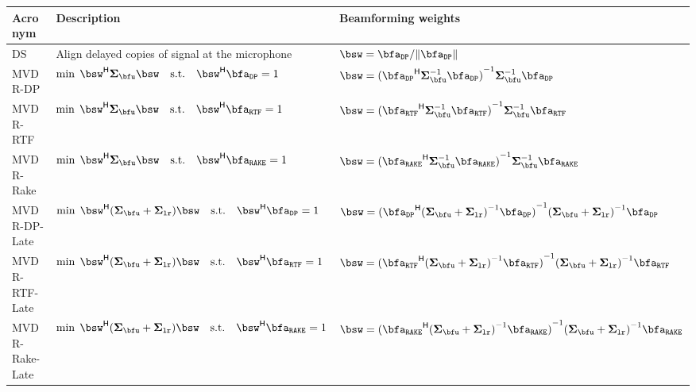 \begin{tabular*}{\linewidth}{lll}
\toprule
Acronym & Description & Beamforming weights \\
\midrule
DS              & Align delayed copies of signal at the microphone
                    &  $\bsw = \bfa_\mathtt{DP} / \kvvbar{\bfa_\mathtt{DP}} $ \\
MVDR-DP         & $\min\; \khermitian{\bsw} \xpsd_{\bfu} \bsw \quad \text{s.t.} \quad \khermitian{\bsw} \bfa_\mathtt{DP} = 1$
                    &  $\bsw = \kinv{(\khermitian{\bfa_\mathtt{DP}} \kinv{\xpsd}_{\bfu}  \bfa_\mathtt{DP})} \kinv{\xpsd}_{\bfu}  \bfa_\mathtt{DP}$\\
MVDR-RTF        & $\min\; \khermitian{\bsw} \xpsd_{\bfu} \bsw \quad \text{s.t.} \quad \khermitian{\bsw} \bfa_\mathtt{RTF} = 1$
                    &  $\bsw = \kinv{(\khermitian{\bfa_\mathtt{RTF}} \kinv{\xpsd}_{\bfu}  \bfa_\mathtt{RTF})} \kinv{\xpsd}_{\bfu}  \bfa_\mathtt{RTF}$\\
MVDR-Rake       & $\min\; \khermitian{\bsw} \xpsd_{\bfu} \bsw \quad \text{s.t.} \quad \khermitian{\bsw} \bfa_\mathtt{RAKE} = 1$
                    &  $\bsw = \kinv{(\khermitian{\bfa_\mathtt{RAKE}} \kinv{\xpsd}_{\bfu}  \bfa_\mathtt{RAKE})} \kinv{\xpsd}_{\bfu}  \bfa_\mathtt{RAKE}$\\
MVDR-DP-Late    & $\min\; \khermitian{\bsw} (\xpsd_{\bfu} + \xpsd_{\mathtt{lr}}) \bsw \quad \text{s.t.} \quad \khermitian{\bsw} \bfa_{\mathtt{DP}} = 1$
                    &  $\bsw = \kinv{(\khermitian{\bfa_\mathtt{DP}} \kinv{(\xpsd_{\bfu} + \xpsd_{\mathtt{lr}})}  \bfa_\mathtt{DP})} \kinv{(\xpsd_{\bfu} + \xpsd_{\mathtt{lr}})}  \bfa_\mathtt{DP}$      \\
MVDR-RTF-Late   & $\min\; \khermitian{\bsw} (\xpsd_{\bfu} + \xpsd_{\mathtt{lr}}) \bsw \quad \text{s.t.} \quad \khermitian{\bsw} \bfa_{\mathtt{RTF}} = 1$
                    &  $\bsw = \kinv{(\khermitian{\bfa_\mathtt{RTF}} \kinv{(\xpsd_{\bfu} + \xpsd_{\mathtt{lr}})}  \bfa_\mathtt{RTF})} \kinv{(\xpsd_{\bfu} + \xpsd_{\mathtt{lr}})}  \bfa_\mathtt{RTF}$   \\
MVDR-Rake-Late  & $\min\; \khermitian{\bsw} (\xpsd_{\bfu} + \xpsd_{\mathtt{lr}}) \bsw \quad \text{s.t.} \quad \khermitian{\bsw} \bfa_{\mathtt{RAKE}} = 1$
                    &  $\bsw = \kinv{(\khermitian{\bfa_\mathtt{RAKE}} \kinv{(\xpsd_{\bfu} + \xpsd_{\mathtt{lr}})}  \bfa_\mathtt{RAKE})} \kinv{(\xpsd_{\bfu} + \xpsd_{\mathtt{lr}})}  \bfa_\mathtt{RAKE}$\\
\bottomrule
\end{tabular*}